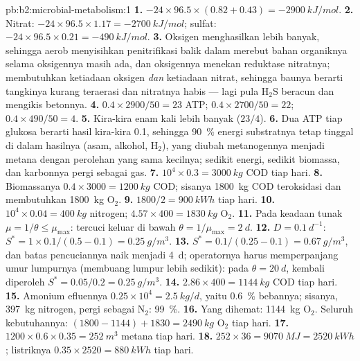 \begin{solution}{pb:b2:microbial-metabolism:1}
\textbf{1.} $-24\times 96.5\times (0.82 + 0.43) = \qty{-2900}{kJ/mol}$.
\textbf{2.} Nitrat: $-24\times 96.5\times 1.17 = \qty{-2700}{kJ/mol}$;
sulfat: $-24\times 96.5\times 0.21 = \qty{-490}{kJ/mol}$.
\textbf{3.} Oksigen menghasilkan lebih banyak, sehingga aerob
menyisihkan penitrifikasi balik dalam merebut bahan organiknya selama
oksigennya masih ada, dan oksigennya menekan reduktase nitratnya;
 membutuhkan ketiadaan oksigen \emph{dan} ketiadaan
nitrat, sehingga baunya berarti tangkinya kurang teraerasi dan
nitratnya habis --- lagi pula $\mathrm{H_2S}$ beracun dan mengikis
betonnya.
\textbf{4.} $0.4\times 2900/50 = 23$ ATP; $0.4\times 2700/50 = 22$;
$0.4\times 490/50 = 4$.
\textbf{5.} Kira-kira enam kali lebih banyak ($23/4$).
\textbf{6.} Dua ATP tiap glukosa berarti hasil kira-kira \num{0.1},
sehingga \qty{90}{\%} energi substratnya tetap tinggal di dalam
hasilnya (asam, alkohol, $\mathrm{H_2}$), yang diubah metanogennya
menjadi metana dengan perolehan yang sama kecilnya; sedikit energi,
sedikit biomassa, dan karbonnya pergi sebagai gas.
\textbf{7.} $10^4\times 0.3 = \qty{3000}{kg}$ COD tiap hari.
\textbf{8.} Biomassanya $0.4\times 3000 = \qty{1200}{kg}$ COD; sisanya
\qty{1800}{kg} COD teroksidasi dan membutuhkan \qty{1800}{kg}
$\mathrm{O_2}$.
\textbf{9.} $1800/2 = \qty{900}{kWh}$ tiap hari.
\textbf{10.} $10^4\times 0.04 = \qty{400}{kg}$ nitrogen;
$4.57\times 400 = \qty{1830}{kg}$ $\mathrm{O_2}$.
\textbf{11.} Pada keadaan tunak $\mu = 1/\theta \le \mu_{\max}$:
tercuci keluar di bawah $\theta = 1/\mu_{\max} = \qty{2}{d}$.
\textbf{12.} $D = \qty{0.1}{d^{-1}}$: $S^* = 1\times 0.1/(0.5 - 0.1)
= \qty{0.25}{g/m^3}$.
\textbf{13.} $S^* = 0.1/(0.25 - 0.1) = \qty{0.67}{g/m^3}$, dan batas
pencuciannya naik menjadi \qty{4}{d}; operatornya harus memperpanjang
umur lumpurnya (membuang lumpur lebih sedikit): pada
$\theta = \qty{20}{d}$, kembali diperoleh $S^* =
0.05/0.2 = \qty{0.25}{g/m^3}$.
\textbf{14.} $2.86\times 400 = \qty{1144}{kg}$ COD tiap hari.
\textbf{15.} Amonium efluennya $0.25\times 10^4 = \qty{2.5}{kg/d}$,
yaitu \qty{0.6}{\%} bebannya; sisanya, \qty{397}{kg} nitrogen, pergi
sebagai $\mathrm{N_2}$: \qty{99}{\%}.
\textbf{16.} Yang dihemat: \qty{1144}{kg} $\mathrm{O_2}$. Seluruh
kebutuhannya: $(1800 - 1144) + 1830 = \qty{2490}{kg}$ $\mathrm{O_2}$
tiap hari.
\textbf{17.} $1200\times 0.6\times 0.35 = \qty{252}{m^3}$ metana
tiap hari.
\textbf{18.} $252\times 36 = \qty{9070}{MJ} = \qty{2520}{kWh}$;
listriknya $0.35\times 2520 = \qty{880}{kWh}$ tiap hari.

\end{solution}
